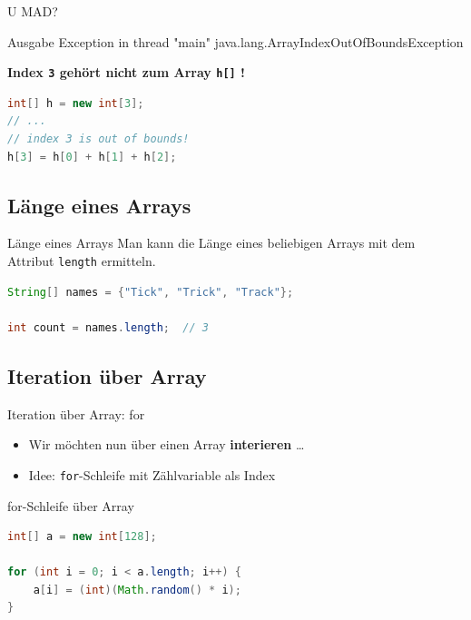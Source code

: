 \documentclass[18pt]{beamer}
\begin{document}
\begin{frame}[fragile]{U MAD?}
    \begin{alertblock}{Ausgabe}
        \alert{Exception in thread "main" java.lang.ArrayIndexOutOfBoundsException}
    \end{alertblock}

\pause

    \textbf{Index \texttt{3} gehört nicht zum Array \texttt{h[]} !}

\begin{exampleblock}{}
    \begin{lstlisting}[language=Java]
int[] h = new int[3];
// ...
// index 3 is out of bounds!
h[3] = h[0] + h[1] + h[2];
    \end{lstlisting}
\end{exampleblock}

\end{frame}

\subsection{Länge eines Arrays}

\begin{frame}[fragile]{Länge eines Arrays}
    Man kann die Länge eines beliebigen Arrays mit dem Attribut \texttt{length} ermitteln.


\begin{exampleblock}{}
    \begin{lstlisting}[language=Java]
String[] names = {"Tick", "Trick", "Track"};

int count = names.length;  // 3
    \end{lstlisting}
\end{exampleblock}

\end{frame}

\subsection{Iteration über Array}

\begin{frame}[fragile]{Iteration über Array: for}
    \begin{itemize}
        \item Wir möchten nun über einen Array \textbf{interieren} \dots
        \item Idee: \texttt{for}-Schleife mit Zählvariable als Index
    \end{itemize}

    \begin{exampleblock}{for-Schleife über Array}
        \begin{lstlisting}[language=Java]
int[] a = new int[128];

for (int i = 0; i < a.length; i++) {
    a[i] = (int)(Math.random() * i);
}
        \end{lstlisting}

    \end{exampleblock}

\end{frame}
\end{document}
